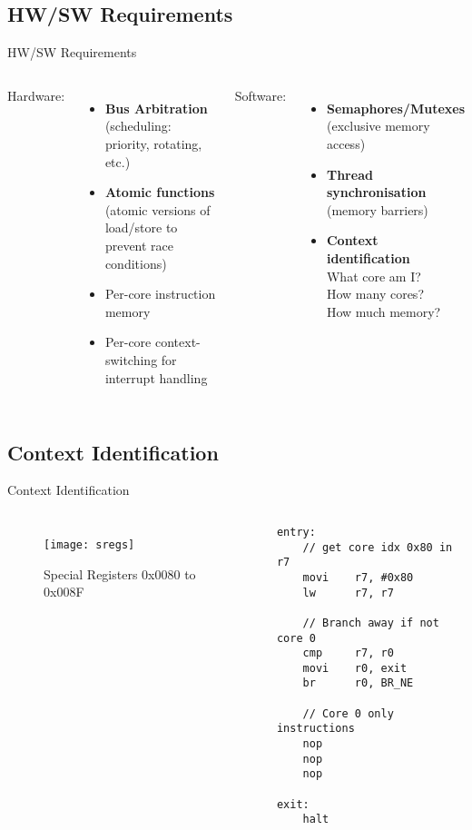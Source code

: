 \documentclass[aspectratio=169]{beamer}
\begin{document}
\subsection{HW/SW Requirements}
\begin{frame}{HW/SW Requirements}
\begin{columns}[t]
Hardware:
\begin{itemize}[<+->]
    \item \textbf{Bus Arbitration}\\ (scheduling: priority, rotating, etc.)
    \item \textbf{Atomic functions}\\ (atomic versions of load/store to prevent race conditions)
    \item Per-core instruction memory
    \item Per-core context-switching for interrupt handling
\end{itemize}
Software:
\begin{itemize}[<+->]
    \item \textbf{Semaphores/Mutexes}\\ (exclusive memory access)
    \item \textbf{Thread synchronisation}\\ (memory barriers)
    \item \textbf{Context identification}\\ What core am I?\\ How many cores?\\ How much memory?
\end{itemize}
\end{columns}
\end{frame}

\subsection{Context Identification}
\begin{frame}[fragile]{Context Identification}
\begin{columns}
\begin{figure}
\texttt{[image: sregs]}
\caption{Special Registers 0x0080 to 0x008F}
\end{figure}
\begin{lstlisting}
entry:
    // get core idx 0x80 in r7
    movi    r7, #0x80
    lw      r7, r7

    // Branch away if not core 0
    cmp     r7, r0
    movi    r0, exit
    br      r0, BR_NE 
    
    // Core 0 only instructions
    nop
    nop
    nop
    
exit:
    halt  
\end{lstlisting}
\end{columns}
\end{frame}
\end{document}
